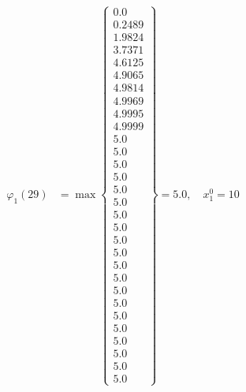 \documentclass{article}
\begin{document}
\begin{align*}
  
\varphi_{1}(29) &= \max \left\{ \begin{array}{c}
0.0 \\
 0.2489 \\
 1.9824 \\
 3.7371 \\
 4.6125 \\
 4.9065 \\
 4.9814 \\
 4.9969 \\
 4.9995 \\
 4.9999 \\
 5.0 \\
 5.0 \\
 5.0 \\
 5.0 \\
 5.0 \\
 5.0 \\
 5.0 \\
 5.0 \\
 5.0 \\
 5.0 \\
 5.0 \\
 5.0 \\
 5.0 \\
 5.0 \\
 5.0 \\
 5.0 \\
 5.0 \\
 5.0 \\
 5.0 \\
 5.0
\end{array} \right\}=5.0,\quad x_{1}^0=10\\
  
  
  

\end{align*}
\end{document}
